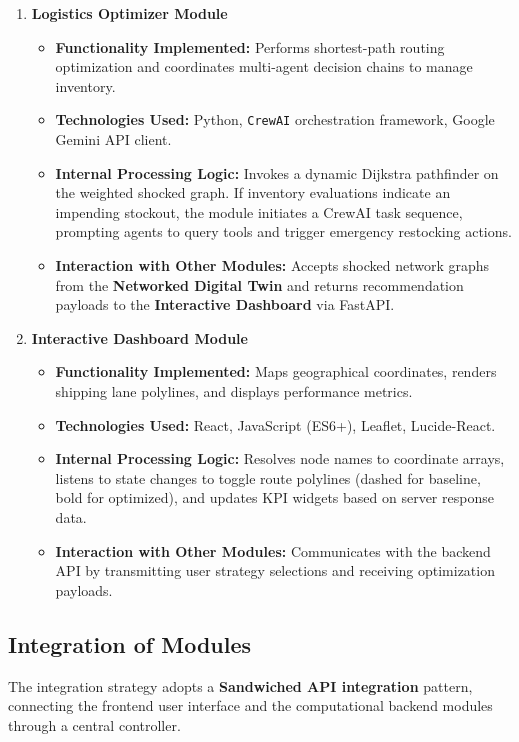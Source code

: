 \begin{enumerate}
    \item \textbf{Logistics Optimizer Module}
    \begin{itemize}
        \item \textbf{Functionality Implemented:} Performs shortest-path routing optimization and coordinates multi-agent decision chains to manage inventory.
        \item \textbf{Technologies Used:} Python, \texttt{CrewAI} orchestration framework, Google Gemini API client.
        \item \textbf{Internal Processing Logic:} Invokes a dynamic Dijkstra pathfinder on the weighted shocked graph. If inventory evaluations indicate an impending stockout, the module initiates a CrewAI task sequence, prompting agents to query tools and trigger emergency restocking actions.
        \item \textbf{Interaction with Other Modules:} Accepts shocked network graphs from the \textbf{Networked Digital Twin} and returns recommendation payloads to the \textbf{Interactive Dashboard} via FastAPI.
    \end{itemize}

    \item \textbf{Interactive Dashboard Module}
    \begin{itemize}
        \item \textbf{Functionality Implemented:} Maps geographical coordinates, renders shipping lane polylines, and displays performance metrics.
        \item \textbf{Technologies Used:} React, JavaScript (ES6+), Leaflet, Lucide-React.
        \item \textbf{Internal Processing Logic:} Resolves node names to coordinate arrays, listens to state changes to toggle route polylines (dashed for baseline, bold for optimized), and updates KPI widgets based on server response data.
        \item \textbf{Interaction with Other Modules:} Communicates with the backend API by transmitting user strategy selections and receiving optimization payloads.
    \end{itemize}
\end{enumerate}

\subsection[Integration of Modules]{Integration of Modules}
The integration strategy adopts a \textbf{Sandwiched API integration} pattern, connecting the frontend user interface and the computational backend modules through a central controller.

